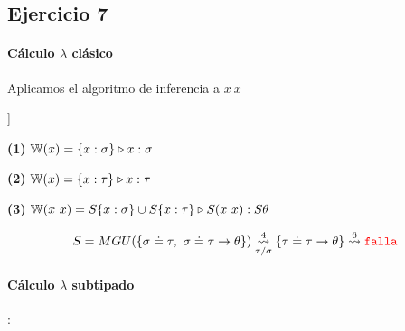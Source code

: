 \documentclass[10pt,a4paper, landscape]{article}
\begin{document}
	\newpage
	\subsection{Ejercicio 7}
	\paragraph{Cálculo $\lambda$ clásico} Aplicamos el algoritmo de inferencia a $x~x$
	
	\vspace*{5mm}
	\setlength{\columnsep}{-5cm}
	\begin{multicols}{2}
		\begin{center}
			\begin{forest}
				[$x~x$ (3),
				[$x$ (1)]
				[$x$ (2)]
				]
			\end{forest}
			
		\end{center}
		
		\vfill\null
		\columnbreak
		
		\textbf{(1)} $\WFunc(x) = \judgeType{\{x:\sigma\}}{x}{\sigma}$
		
		\textbf{(2)} $\WFunc(x) = \judgeType{\{x:\tau\}}{x}{\tau}$
		
		\textbf{(3)} $\WFunc(x~x) = \judgeType{S\{x:\sigma\}\cup S\{x:\tau\} }{S(x~x)}{S\theta}$
		
		\begin{align*}
		S = MGU(\{\sigma\doteq\tau,~\sigma\doteq \tau \to \theta\}) \goesTo{4}{\tau/\sigma}\{\tau\doteq \tau \to \theta\} \goesTo{6}{} \falla
		\end{align*}
	\end{multicols}
	\setlength{\columnsep}{-1cm}
	
	\paragraph{Cálculo $\lambda$ subtipado}:
	
\end{document}
